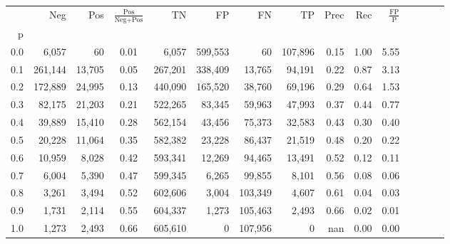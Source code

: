\begin{tabular}{rrrcrrrrrrrrrrr}
\toprule
{} &      Neg &     Pos & $\frac{\text{Pos}}{\text{Neg}+\text{Pos}}$ &       TN &       FP &       FN &       TP &  Prec &   Rec & $\frac{\text{FP}}{\text{P}}$ \\
p   &          &         &                                            &          &          &          &          &       &       &                              \\
\midrule
0.0 &    6,057 &      60 &                                       0.01 &    6,057 &  599,553 &       60 &  107,896 &  0.15 &  1.00 &                         5.55 \\
0.1 &  261,144 &  13,705 &                                       0.05 &  267,201 &  338,409 &   13,765 &   94,191 &  0.22 &  0.87 &                         3.13 \\
0.2 &  172,889 &  24,995 &                                       0.13 &  440,090 &  165,520 &   38,760 &   69,196 &  0.29 &  0.64 &                         1.53 \\
0.3 &   82,175 &  21,203 &                                       0.21 &  522,265 &   83,345 &   59,963 &   47,993 &  0.37 &  0.44 &                         0.77 \\
0.4 &   39,889 &  15,410 &                                       0.28 &  562,154 &   43,456 &   75,373 &   32,583 &  0.43 &  0.30 &                         0.40 \\
0.5 &   20,228 &  11,064 &                                       0.35 &  582,382 &   23,228 &   86,437 &   21,519 &  0.48 &  0.20 &                         0.22 \\
0.6 &   10,959 &   8,028 &                                       0.42 &  593,341 &   12,269 &   94,465 &   13,491 &  0.52 &  0.12 &                         0.11 \\
0.7 &    6,004 &   5,390 &                                       0.47 &  599,345 &    6,265 &   99,855 &    8,101 &  0.56 &  0.08 &                         0.06 \\
0.8 &    3,261 &   3,494 &                                       0.52 &  602,606 &    3,004 &  103,349 &    4,607 &  0.61 &  0.04 &                         0.03 \\
0.9 &    1,731 &   2,114 &                                       0.55 &  604,337 &    1,273 &  105,463 &    2,493 &  0.66 &  0.02 &                         0.01 \\
1.0 &    1,273 &   2,493 &                                       0.66 &  605,610 &        0 &  107,956 &        0 &   nan &  0.00 &                         0.00 \\
\bottomrule
\end{tabular}
